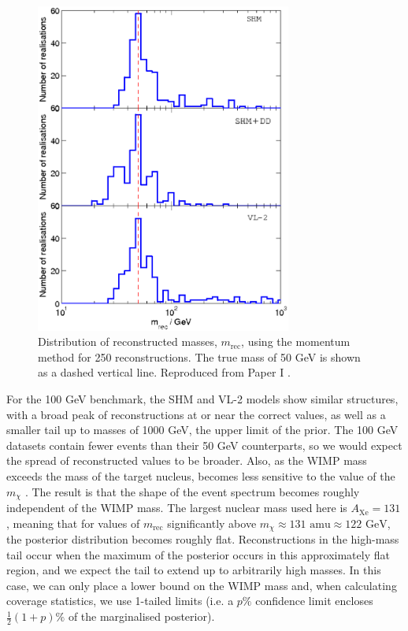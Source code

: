  \begin{figure}[t]
\centering
\includegraphics[width=0.75\textwidth]{Speed/50GeV-1.eps}
\caption[Distribution of reconstructed masses using the binned momentum distribution for a 50 GeV WIMP with SHM, SHM+DD and VL2 distribution functions]{Distribution of reconstructed masses, \(m_\textrm{rec}\), using the momentum method for 250 reconstructions. The true mass of 50 GeV is shown as a dashed vertical line. Reproduced from Paper I \cite{Kavanagh:2012}.}
  \label{fig:Speed:recons50}
\end{figure}


For the 100 GeV benchmark, the SHM and VL-2 models show similar structures, with a broad peak of reconstructions at or near the correct values, as well as a smaller tail up to masses of 1000 GeV, the upper limit of the prior. The 100 GeV datasets contain fewer events than their 50 GeV counterparts, so we would expect the spread of reconstructed values to be broader. Also, as the WIMP mass exceeds the mass of the target nucleus, \vmin becomes less sensitive to the value of the $m_\chi$ \cite{Peter:2011}. The result is that the shape of the event spectrum becomes roughly independent of the WIMP mass. The largest nuclear mass used here is \(A_\textrm{Xe} = 131\), meaning that for values of \(m_\textrm{rec}\) significantly above \(m_\chi \approx 131 \textrm{ amu} \approx 122 \textrm{ GeV}\), the posterior distribution becomes roughly flat. Reconstructions in the high-mass tail occur when the maximum of the posterior occurs in this approximately flat region, and we expect the tail to extend up to arbitrarily high masses. In this case, we can only place a lower bound on the WIMP mass and, when calculating coverage statistics, we use 1-tailed limits (i.e. a \(p\%\) confidence limit encloses \(\frac{1}{2}(1+p) \%\) of the marginalised posterior).

